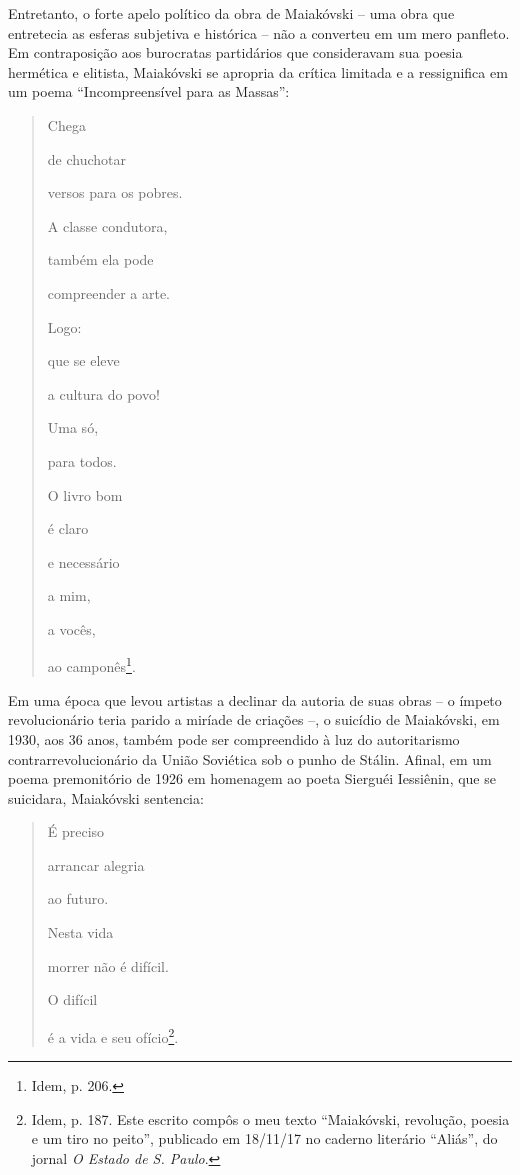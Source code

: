 Entretanto, o forte apelo político da obra de Maiakóvski -- uma obra que
entretecia as esferas subjetiva e histórica -- não a converteu em um
mero panfleto. Em contraposição aos burocratas partidários que
consideravam sua poesia hermética e elitista, Maiakóvski se apropria da
crítica limitada e a ressignifica em um poema ``Incompreensível para as
Massas'':

\begin{quote}
Chega

de chuchotar

versos para os pobres.

A classe condutora,

também ela pode

compreender a arte.

Logo:

que se eleve

a cultura do povo!

Uma só,

para todos.

O livro bom

é claro

e necessário

a mim,

a vocês,

ao camponês\footnote{Idem, p. 206.}.
\end{quote}

Em uma época que levou artistas a declinar da autoria de suas obras -- o
ímpeto revolucionário teria parido a miríade de criações --, o suicídio
de Maiakóvski, em 1930, aos 36 anos, também pode ser compreendido à luz
do autoritarismo contrarrevolucionário da União Soviética sob o punho de
Stálin. Afinal, em um poema premonitório de 1926 em homenagem ao poeta
Sierguéi Iessiênin, que se suicidara, Maiakóvski sentencia:

\begin{quote}
É preciso

arrancar alegria

ao futuro.

Nesta vida

morrer não é difícil.

O difícil

é a vida e seu ofício\footnote{Idem, p. 187. Este escrito compôs o meu
  texto ``Maiakóvski, revolução, poesia e um tiro no peito'', publicado
  em 18/11/17 no caderno literário ``Aliás'', do jornal \emph{O Estado
  de S. Paulo}.}.
\end{quote}

